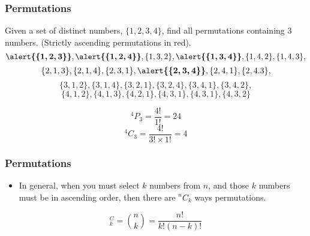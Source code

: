 \documentclass{beamer}
\begin{document}
\begin{frame}
\frametitle{ Permutations}
\large
Given a set of distinct numbers, $\{1, 2, 3, 4 \}$, find all permutations containing 3 numbers. (Strictly ascending permutations in red). 
 \[\boldsymbol{\alert{\{1,2,3\}}}, \boldsymbol{\alert{\{1,2,4\}}}, \{1,3,2\},\boldsymbol{\alert{\{1,3,4\}}}, \{1,4,2\},\{1,4,3\},  \]
 \[\{2,1,3\}, \{2,1,4\}, \{2,3,1\},\boldsymbol{\alert{\{2,3,4\}}}, \{2,4,1\},\{2,4.3\},  \]
 \[\{3,1,2\}, \{3,1,4\}, \{3,2,1\},\{3,2,4\}, \{3,4,1\},\{3,4,2\},  \]
 \[\{4,1,2\}, \{4,1,3\}, \{4,2,1\},\{4,3,1\}, \{4,3,1\},\{4,3,2\}   \]  


\[ ^4P_3 = \frac{4!}{1!} = 24 \]
\[ ^4C_3 = \frac{4!}{3!\times 1!} = 4 \]


\end{frame}
\begin{frame}
\frametitle{ Permutations}
\large
\begin{itemize}
\item In general, when you must select $k$ numbers from $n$, and those $k$ numbers must be in ascending order, then there are $^nC_k$ ways permutations.
\end{itemize}
\[ ^C_k = {n \choose k} = \frac{n!}{k!(n-k)!} \]
\end{frame}
\end{document}
